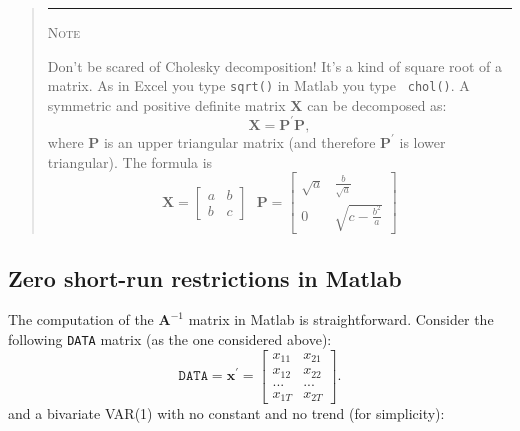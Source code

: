 \documentclass[11pt,a4paper]{report}
\numberwithin{equation}{chapter}
\numberwithin{section}{chapter}
\begin{document}
%
\begin{quotation}
\noindent \rule{1cm}{.4pt}   {\scshape Note}   \hrulefill
\vspace{-.36cm}

\noindent \hrulefill
\small
\singlespacing
\color{note}\sffamily%

Don't be scared of Cholesky decomposition! It's a kind of square root of a
matrix. As in Excel you type \texttt{sqrt()} in Matlab you type \texttt{%
chol()}. A symmetric and positive definite matrix $\mathbf{X}$ can be
decomposed as:%
\begin{equation*}
\mathbf{X}=\mathbf{P}^{\prime }\mathbf{P,}
\end{equation*}%
where $\mathbf{P}$ is an upper triangular matrix (and therefore $\mathbf{P}%
^{\prime }$ is lower triangular). The formula is 
\begin{equation*}
\mathbf{X}=%
\begin{bmatrix}
a & b \\ 
b & c%
\end{bmatrix}%
\ \ \ \mathbf{P}=%
\begin{bmatrix}
\sqrt{a} & \frac{b}{\sqrt{a}} \\ 
0 & \sqrt{c-\frac{b^{2}}{a}}%
\end{bmatrix}%
\end{equation*}

%
\color{black}
\noindent \hrulefill 
\vspace{-.5cm}

\noindent \hrulefill
\end{quotation}
\bigskip%

\subsection{Zero short-run restrictions in Matlab}

The computation of the $\mathbf{A}^{-1}$ matrix in Matlab is
straightforward. Consider the following \texttt{DATA} matrix (as the one
considered above):%
\begin{equation*}
\mathtt{DATA}=\mathbf{x}^{\prime }=\left[ 
\begin{array}{cc}
x_{11} & x_{21} \\ 
x_{12} & x_{22} \\ 
... & ... \\ 
x_{1T} & x_{2T}%
\end{array}%
\right] .
\end{equation*}%
and a bivariate VAR(1) with no constant and no trend (for
simplicity):\medskip
\end{document}
